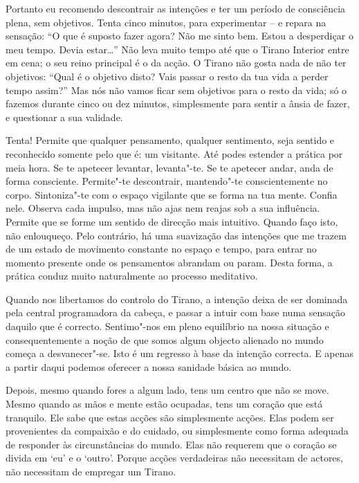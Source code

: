 Portanto eu recomendo descontrair as intenções e ter um período de
consciência plena, sem objetivos. Tenta cinco minutos, para experimentar
-- e repara na sensação: “O que é suposto fazer agora? Não me sinto bem.
Estou a desperdiçar o meu tempo. Devia estar\ldots{}” Não leva muito tempo
até que o Tirano Interior entre em cena; o seu reino principal é o da
acção. O Tirano não gosta nada de não ter objetivos: “Qual é o objetivo
disto? Vais passar o resto da tua vida a perder tempo assim?” Mas nós
não vamos ficar sem objetivos para o resto da vida; só o fazemos durante
cinco ou dez minutos, simplesmente para sentir a ânsia de fazer, e
questionar a sua validade.

Tenta! Permite que qualquer pensamento, qualquer sentimento, seja
sentido e reconhecido somente pelo que é: um visitante. Até podes
estender a prática por meia hora. Se te apetecer levantar, levanta"-te.
Se te apetecer andar, anda de forma consciente. Permite"-te descontrair,
mantendo"-te conscientemente no corpo. Sintoniza"-te com o espaço
vigilante que se forma na tua mente. Confia nele. Observa cada impulso,
mas não ajas nem reajas sob a sua influência. Permite que se forme um
sentido de direcção mais intuitivo. Quando faço isto, não enlouqueço.
Pelo contrário, há uma suavização das intenções que me trazem de um
estado de movimento constante no espaço e tempo, para entrar no momento
presente onde os pensamentos abrandam ou param. Desta forma, a prática
conduz muito naturalmente ao processo meditativo.

\sectionBreak

Quando nos libertamos do controlo do Tirano, a intenção deixa de ser
dominada pela central programadora da cabeça, e passar a intuir com base
numa sensação daquilo que é correcto. Sentimo"-nos em pleno equilíbrio na
nossa situação e consequentemente a noção de que somos algum objecto
alienado no mundo começa a desvanecer"-se. Isto é um regresso à base da
intenção correcta. E apenas a partir daqui podemos oferecer a nossa
sanidade básica ao mundo.

Depois, mesmo quando fores a algum lado, tens um centro que não se move.
Mesmo quando as mãos e mente estão ocupadas, tens um coração que está
tranquilo. Ele sabe que estas acções são simplesmente acções. Elas podem
ser provenientes da compaixão e do cuidado, ou simplesmente como forma
adequada de responder às circunstâncias do mundo. Elas não requerem que
o coração se divida em `eu' e o `outro'. Porque acções verdadeiras não
necessitam de actores, não necessitam de empregar um Tirano.
